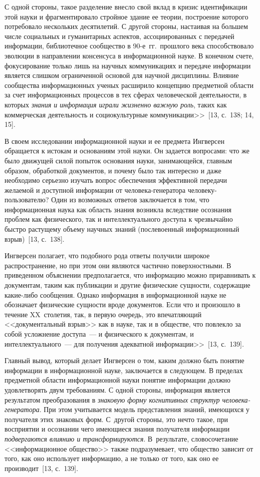 \begin{multicols}{2}
      С одной стороны, такое разделение внесло свой вклад в кризис идентификации этой
науки и фрагментировало стройное здание ее теории, построение которого потребовало
нескольких десятилетий. С другой стороны, настаивая на большем числе социальных и
гуманитарных аспектов, ассо\-ци\-иро\-ван\-ных с передачей информации, библиотечное сообщество
в 90-е~гг.\ прошлого века способствовало эволюции в направлении консенсуса в
информационной науке. В конечном счете, фокусирование только лишь на научных
коммуникациях и передаче информации является слишком ограниченной основой для научной
дисциплины. Влияние сообщества информационных ученых расширило концепцию
предметной области за счет информационных процессов в тех сферах человеческой
деятельности, в которых \textit{знания и информация играли жизненно важную роль}, таких как
коммерческая деятельность и социокультурные коммуникации>>~[13, с.~138; 14, 15].

      В своем исследовании информационной науки и ее предмета Ингверсен обращается к
истокам и основаниям этой науки. Он задается вопросами: что же было движущей силой
попыток основания науки, занимающейся, главным образом, обработкой документов, и почему
было так интересно и даже необходимо серьезно изучать вопрос обеспечения эффективной
передачи желаемой и доступной информации от человека-генератора человеку-пользователю?
Один из возможных ответов заключается в том, что информационная наука как область знания
возникла вследствие осознания проблем как физического, так и интеллектуального доступа к
чрезвычайно быстро растущему объему научных знаний (послевоенный информационный
взрыв)~[13, с.~138].

      Ингверсен полагает, что подобного рода ответы получили широкое распространение, но
при этом они являются частично поверхностными. В приведенном объяснении предполагается,
что информацию можно приравнивать к документам, таким как публикации и другие
физические сущности, содержащие какие-либо сообщения. Однако информация в
информационной науке не обозначает физические сущности вроде документов. Если что и
произошло в течение XX~столетия, так, в первую очередь, это впечатляющий
<<документальный взрыв>> как в науке, так и в обществе, что повлекло за собой усложнение
доступа~--- и физического к документам, и интеллектуального~--- для получения адекватной
информации>>~[13, с.~139].

      Главный вывод, который делает Ингверсен о том, каким должно быть понятие
информации в информационной науке, заключается в сле\-ду\-ющем. В пределах предметной
области информационной науки понятие информации должно удов\-ле\-тво\-рять двум
требованиям. С одной стороны, информация является результатом преобразования в
\textit{знаковую форму когнитивных структур че\-ло\-ве\-ка-ге\-не\-ра\-то\-ра}. При этом учитывается
модель представления знаний, имеющихся у получателя этих знаковых форм. С~другой
стороны, это нечто такое, при восприятии и осознании чего имеющиеся знания получателя
информации \textit{подвергаются влиянию и транс\-фор\-ми\-ру\-ют\-ся}. В~результате,
словосочетание <<ин\-фор\-ма\-ци\-он\-ное общество>> также подразумевает, что общество зависит от
того, как оно использует информацию, а не только от того, как оно ее
производит~[13, с.~139].


\end{multicols}

